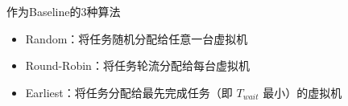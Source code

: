 \begin{frame}{作为Baseline的3种算法}

    \begin{itemize}
        \item Random：将任务随机分配给任意一台虚拟机
        \item Round-Robin：将任务轮流分配给每台虚拟机
        \item Earliest：将任务分配给最先完成任务（即 $T_{wait}$ 最小）的虚拟机
    \end{itemize}

\end{frame}

